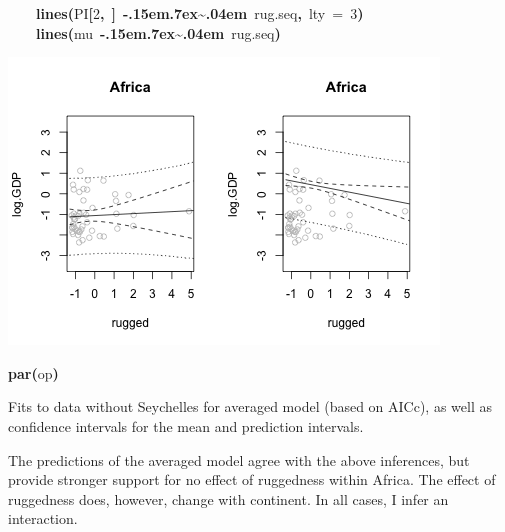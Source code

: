 \documentclass{article}
\makeatletter
\newcommand{\hlnumber}[1]{\textcolor[rgb]{0,0,0}{#1}}%
\newcommand{\hlfunctioncall}[1]{\textcolor[rgb]{.5,0,.33}{\textbf{#1}}}%
\newcommand{\hlkeyword}[1]{\textbf{#1}}%
\newcommand{\hlargument}[1]{\textcolor[rgb]{.69,.25,.02}{#1}}%
\newcommand{\hlsymbol}[1]{#1}%
\def\urltilda{\kern -.15em\lower .7ex\hbox{\~{}}\kern .04em}%
\newcommand{\hlstd}[1]{\textcolor[rgb]{0,0,0}{#1}}%
\newenvironment{kframe}{%
 \def\FrameCommand##1{\hskip\@totalleftmargin \hskip-\fboxsep
 \colorbox{shadecolor}{##1}\hskip-\fboxsep
     \hskip-\linewidth \hskip-\@totalleftmargin \hskip\columnwidth}%
 \MakeFramed {\advance\hsize-\width
   \@totalleftmargin\z@ \linewidth\hsize
   \@setminipage}}%
 {\par\unskip\endMakeFramed}
\newenvironment{knitrout}{}{} %
\makeatother
\begin{document}
\begin{knitrout}
{\begin{kframe}
\begin{flushleft}
\hlstd{}{\ }{\ }{\ }{\ }\hlfunctioncall{lines}\hlkeyword{(}\hlsymbol{PI}\hlkeyword{[}\hlnumber{2}\hlkeyword{,}{\ }\hlkeyword{]}{\ }\hlkeyword{\urltilda{}}{\ }\hlsymbol{rug.seq}\hlkeyword{,}{\ }\hlargument{lty}{\ }\hlargument{=}{\ }\hlnumber{3}\hlkeyword{)}\hspace*{\fill}\\
\hlstd{}{\ }{\ }{\ }{\ }\hlfunctioncall{lines}\hlkeyword{(}\hlsymbol{mu}{\ }\hlkeyword{\urltilda{}}{\ }\hlsymbol{rug.seq}\hlkeyword{)}\hspace*{\fill}\\
\hlstd{}\hlkeyword{\usebox{\hlnormalsizeboxclosebrace}}\mbox{}
\normalfont
\end{flushleft}
\includegraphics{AICc-avg} \begin{flushleft}
\ttfamily\noindent
\hlfunctioncall{par}\hlkeyword{(}\hlsymbol{op}\hlkeyword{)}\mbox{}
\normalfont
\end{flushleft}
\end{kframe}}
\end{knitrout}

Fits to data without Seychelles for averaged model (based on AICc), as well as confidence intervals for the mean and prediction intervals.

The predictions of the averaged model agree with the above inferences, but provide stronger support for no effect of ruggedness within Africa. 
The effect of ruggedness does, however, change with continent. 
In all cases, I infer an interaction.
\end{document}
